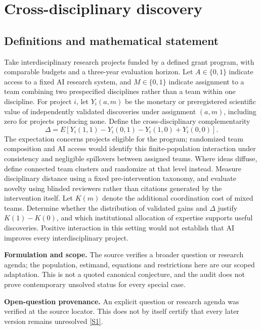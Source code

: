 \documentclass[11pt]{article}
\newcommand{\sref}[2]{\hyperlink{source:#1:#2}{[S#2]}}
\begin{document}
\section*{Cross-disciplinary discovery}\label{30007693}
\subsection{Definitions and mathematical statement}
Take interdisciplinary research projects funded by a defined grant program, with comparable budgets and a three-year evaluation horizon. Let \(A\in\{0,1\}\) indicate access to a fixed AI research system, and \(M\in\{0,1\}\) indicate assignment to a team combining two prespecified disciplines rather than a team within one discipline. For project \(i\), let \(Y_i(a,m)\) be the monetary or preregistered scientific value of independently validated discoveries under assignment \((a,m)\), including zero for projects producing none. Define the cross-disciplinary complementarity
\[
\Delta=E[Y_i(1,1)-Y_i(0,1)-Y_i(1,0)+Y_i(0,0)].
\]
The expectation concerns projects eligible for the program; randomized team composition and AI access would identify this finite-population interaction under consistency and negligible spillovers between assigned teams. Where ideas diffuse, define connected team clusters and randomize at that level instead. Measure disciplinary distance using a fixed pre-intervention taxonomy, and evaluate novelty using blinded reviewers rather than citations generated by the intervention itself. Let \(K(m)\) denote the additional coordination cost of mixed teams. Determine whether the distribution of validated gains and \(\Delta\) justify \(K(1)-K(0)\), and which institutional allocation of expertise supports useful discoveries. Positive interaction in this setting would not establish that AI improves every interdisciplinary project.

\par\textbf{Formulation and scope.} The source verifies a broader question or research agenda; the population, estimand, equations and restrictions here are our scoped adaptation. This is not a quoted canonical conjecture, and the audit does not prove contemporary unsolved status for every special case.

\par\textbf{Open-question provenance.} An explicit question or research agenda was verified at the source locator. This does not by itself certify that every later version remains unresolved \sref{30007693}{1}.
\end{document}
